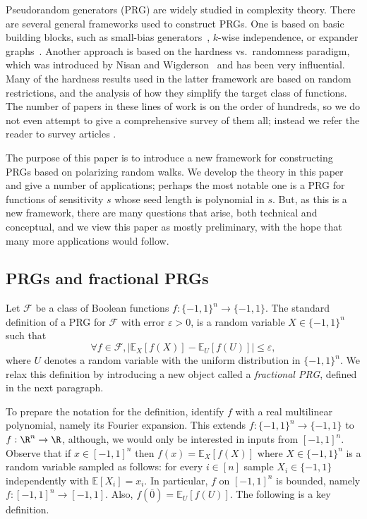 \documentclass{toc}
\newcommand{\E}{\mathbb{E}}
\newcommand{\FF}{\mathcal{F}}
\newcommand{\eps}{\varepsilon}
\newcommand{\zero}{\overline{0}}
\begin{document}
Pseudorandom generators (PRG) are widely studied in complexity theory. There are several general frameworks used to construct PRGs.
One is based on basic building blocks, such as
%
small-bias   %
generators~\cite{naor1993small,alon1992simple}, $k$-wise independence,
or expander graphs~\cite{hoory2006expander}. Another approach is based on
the %
hardness vs.\ randomness paradigm, which was introduced by
Nisan and Wigderson~\cite{nisan1988hardness} and has been very influential. Many of the hardness results used in the latter framework
are based on random restrictions, and the analysis of how
they simplify the target class of functions.
%
The number of papers in these lines of work is on the
order of hundreds, so we do not even attempt to give a comprehensive survey of them all; instead we refer the reader to survey articles \cite{goldreich2010primer,vadhan2012pseudorandomness}.

The purpose of this paper is to introduce a new framework for constructing PRGs based on polarizing random walks. We develop the theory
in this paper and give a number of applications; perhaps the most notable one is a PRG for functions of sensitivity $s$ whose seed
length is polynomial in $s$. But, as this is a new framework, there are many questions that arise, both technical and conceptual,
and we view this paper as mostly preliminary, with the hope that many more applications would follow.

\subsection{PRGs and fractional PRGs}
Let $\FF$ be a class of Boolean functions $f:\{-1,1\}^n \to \{-1,1\}$. The standard definition of a PRG for $\FF$ with error $\eps>0$,
is a random variable $X \in \{-1,1\}^n$ such that
$$
\forall f\in \FF, |\E_X[f(X)] - \E_U[f(U)]| \le \eps,
$$
where $U$ denotes a random variable with the uniform distribution in $\{-1,1\}^n$.  We relax this definition by introducing a new object called a \emph{fractional PRG}, defined in the next paragraph.

To prepare the notation for the definition, identify $f$ with a real multilinear polynomial, namely its Fourier expansion. This extends $f:\{-1,1\}^n\rightarrow \{-1,1\}$ to $f:\R^n \to \R$, although, we would only
be interested in inputs from $[-1,1]^n$. Observe that if $x \in [-1,1]^n$ then $f(x) = \E_X[f(X)]$ where $X \in \{-1,1\}^n$ is a random variable
sampled as follows: for every $i \in [n]$ sample $X_i \in \{-1,1\}$ independently with $\E[X_i]=x_i$.
In particular, $f$ on $[-1,1]^n$ is bounded, namely $f:[-1,1]^n \to [-1,1]$. Also, $f(\zero) = \E_U[f(U)]$. The following is a key definition.
\end{document}
